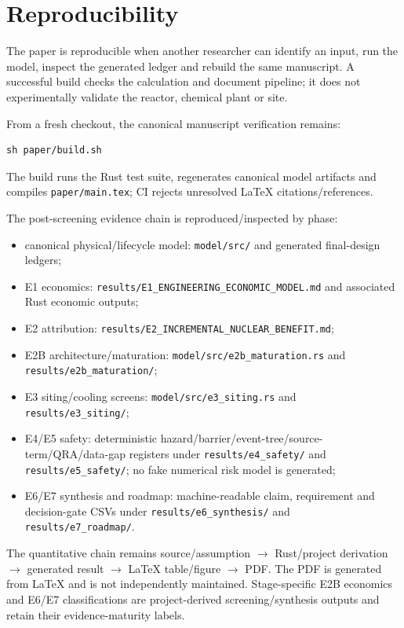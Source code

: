 \section{Reproducibility}

The paper is reproducible when another researcher can identify an input, run the model, inspect the generated ledger and rebuild the same manuscript. A successful build checks the calculation and document pipeline; it does not experimentally validate the reactor, chemical plant or site.

From a fresh checkout, the canonical manuscript verification remains:
\begin{verbatim}
sh paper/build.sh
\end{verbatim}
The build runs the Rust test suite, regenerates canonical model artifacts and compiles \texttt{paper/main.tex}; CI rejects unresolved LaTeX citations/references.

The post-screening evidence chain is reproduced/inspected by phase:
\begin{itemize}
\item canonical physical/lifecycle model: \texttt{model/src/} and generated final-design ledgers;
\item E1 economics: \texttt{results/E1\_ENGINEERING\_ECONOMIC\_MODEL.md} and associated Rust economic outputs;
\item E2 attribution: \texttt{results/E2\_INCREMENTAL\_NUCLEAR\_BENEFIT.md};
\item E2B architecture/maturation: \texttt{model/src/e2b\_maturation.rs} and \texttt{results/e2b\_maturation/};
\item E3 siting/cooling screens: \texttt{model/src/e3\_siting.rs} and \texttt{results/e3\_siting/};
\item E4/E5 safety: deterministic hazard/barrier/event-tree/source-term/QRA/data-gap registers under \texttt{results/e4\_safety/} and \texttt{results/e5\_safety/}; no fake numerical risk model is generated;
\item E6/E7 synthesis and roadmap: machine-readable claim, requirement and decision-gate CSVs under \texttt{results/e6\_synthesis/} and \texttt{results/e7\_roadmap/}.
\end{itemize}

The quantitative chain remains source/assumption $\rightarrow$ Rust/project derivation $\rightarrow$ generated result $\rightarrow$ LaTeX table/figure $\rightarrow$ PDF. The PDF is generated from LaTeX and is not independently maintained. Stage-specific E2B economics and E6/E7 classifications are project-derived screening/synthesis outputs and retain their evidence-maturity labels.

